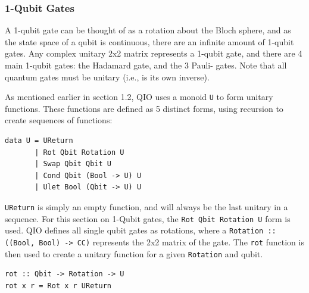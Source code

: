 \documentclass[a4paper,10pt, titlepage, twoside]{article}
\begin{document}
\subsubsection{1-Qubit Gates}
A 1-qubit gate can be thought of as a rotation about the Bloch sphere, and as the state space of a qubit is continuous, there are an infinite amount of 1-qubit gates. Any complex unitary 2x2 matrix represents a 1-qubit gate, and there are 4 main 1-qubit gates: the Hadamard gate, and the 3 Pauli- gates. Note that all quantum gates must be unitary (i.e., is its own inverse).\par
As mentioned earlier in section 1.2, QIO uses a monoid \texttt{U} to form unitary functions. These functions are defined as 5 distinct forms, using recursion to create sequences of functions:
\begin{verbatim}
data U = UReturn
       | Rot Qbit Rotation U
       | Swap Qbit Qbit U
       | Cond Qbit (Bool -> U) U
       | Ulet Bool (Qbit -> U) U
\end{verbatim}
\texttt{UReturn} is simply an empty function, and will always be the last unitary in a sequence. For this section on 1-Qubit gates, the \texttt{Rot Qbit Rotation U} form is used. QIO defines all single qubit gates as rotations, where a \texttt{Rotation :: ((Bool, Bool) -> CC)} represents the 2x2 matrix of the gate. The \texttt{rot} function is then used to create a unitary function for a given \texttt{Rotation} and qubit.
\begin{verbatim}
rot :: Qbit -> Rotation -> U
rot x r = Rot x r UReturn
\end{verbatim}
\end{document}
